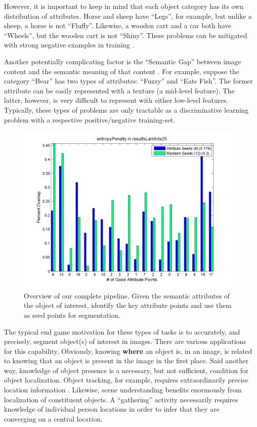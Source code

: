 \documentclass[10pt,twocolumn,letterpaper]{article}
\begin{document}
However, it is important to keep in mind that each object category has its own distribution of attributes.  Horse and sheep have ``Legs'', for example, but unlike a sheep, a horse is not ``Fluffy''.  Likewise, a wooden cart and a car both have ``Wheels'', but the wooden cart is not ``Shiny''.  These problems can be mitigated with strong negative examples in training \cite{Farhadi2009,Farhadi2010}.

Another potentially complicating factor is the ``Semantic Gap'' between image content and the semantic meaning of that content \cite{Ma2007}.  For example, suppose the category ``Bear'' has two types of attributes: ``Fuzzy'' and ``Eats Fish''.  The former attribute can be easily represented with a texture (a mid-level feature).  The latter, however, is very difficult to represent with either low-level features.  Typically, these types of problems are only tractable as a discriminative learning problem with a respective positive/negative training-set.

\begin{figure}[t]
\begin{center}
    \includegraphics[width=0.9\linewidth]{carscore}
\end{center}
\caption{Overview of our complete pipeline. Given the semantic attributes of the object of interest, identify the key attribute points and use them as seed points for segmentation.}
\label{fig:overview}
\end{figure}

The typical end game motivation for these types of tasks is to accurately, and precisely, segment object(s) of interest in images.  There are various applications for this capability.  Obviously, knowing \textbf{where} an object is, in an image, is related to knowing that an object is present in the image in the first place.  Said another way, knowledge of object presence is a necessary, but not sufficient, condition for object localization.  Object tracking, for example, requires extraordinarily precise location information \cite{Choi2012}.  Likewise, scene understanding benefits enormously from localization of constituent objects.  A ``gathering'' activity necessarily requires knowledge of individual person locations in order to infer that they are converging on a central location.
\end{document}
